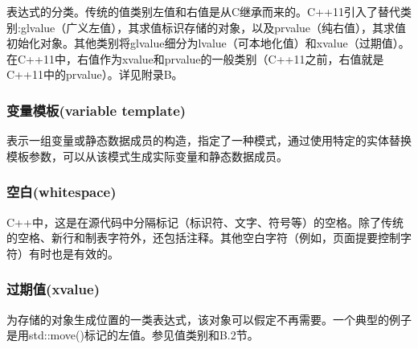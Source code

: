 表达式的分类。传统的值类别左值和右值是从C继承而来的。C++11引入了替代类别:glvalue（广义左值），其求值标识存储的对象，以及prvalue（纯右值），其求值初始化对象。其他类别将glvalue细分为lvalue（可本地化值）和xvalue（过期值）。在C++11中，右值作为xvalue和prvalue的一般类别（C++11之前，右值就是C++11中的prvalue）。详见附录B。

\subsubsection{变量模板(variable template)}

表示一组变量或静态数据成员的构造，指定了一种模式，通过使用特定的实体替换模板参数，可以从该模式生成实际变量和静态数据成员。

\subsubsection{空白(whitespace)}

C++中，这是在源代码中分隔标记（标识符、文字、符号等）的空格。除了传统的空格、新行和制表字符外，还包括注释。其他空白字符（例如，页面提要控制字符）有时也是有效的。

\subsubsection{过期值(xvalue)}

为存储的对象生成位置的一类表达式，该对象可以假定不再需要。一个典型的例子是用std::move()标记的左值。参见值类别和B.2节。




















